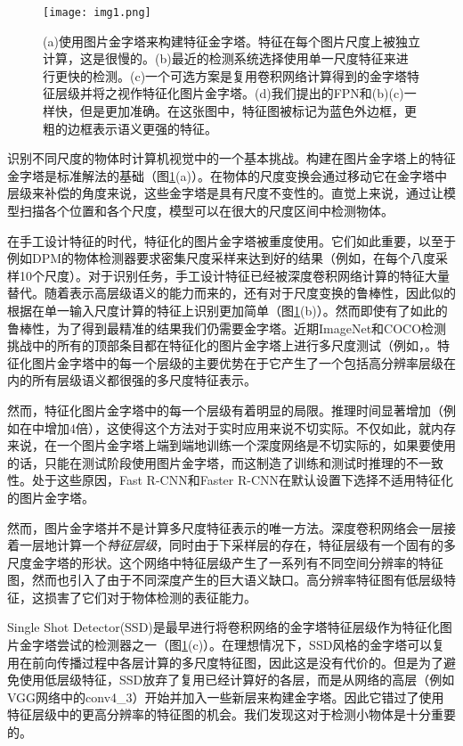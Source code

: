 \documentclass[../main.tex]{subfile}
\begin{document}
\begin{figure}[htb]
    \centering
    \texttt{[image: img1.png]}
    \caption{(a)使用图片金字塔来构建特征金字塔。特征在每个图片尺度上被独立计算，这是很慢的。(b)最近的检测系统选择使用单一尺度特征来进行更快的检测。(c)一个可选方案是复用卷积网络计算得到的金字塔特征层级并将之视作特征化图片金字塔。(d)我们提出的FPN和(b)(c)一样快，但是更加准确。在这张图中，特征图被标记为蓝色外边框，更粗的边框表示语义更强的特征。}
    \label{fig:img1}
\end{figure}


识别不同尺度的物体时计算机视觉中的一个基本挑战。构建在图片金字塔上的特征金字塔是标准解法的基础\cite{pyramid}（图\ref{fig:img1}(a)）。在物体的尺度变换会通过移动它在金字塔中层级来补偿的角度来说，这些金字塔是具有尺度不变性的。直觉上来说，通过让模型扫描各个位置和各个尺度，模型可以在很大的尺度区间中检测物体。

在手工设计特征的时代，特征化的图片金字塔被重度使用。它们如此重要，以至于例如DPM的物体检测器要求密集尺度采样来达到好的结果（例如，在每个八度采样10个尺度）。对于识别任务，手工设计特征已经被深度卷积网络计算的特征大量替代。随着表示高层级语义的能力而来的，还有对于尺度变换的鲁棒性，因此似的根据在单一输入尺度计算的特征上识别更加简单（图\ref{fig:img1}(b)）。然而即使有了如此的鲁棒性，为了得到最精准的结果我们仍需要金字塔。近期ImageNet和COCO检测挑战中的所有的顶部条目都在特征化的图片金字塔上进行多尺度测试（例如，\cite{resnet, rcnnohem}。特征化图片金字塔中的每一个层级的主要优势在于它产生了一个包括高分辨率层级在内的所有层级语义都很强的多尺度特征表示。

然而，特征化图片金字塔中的每一个层级有着明显的局限。推理时间显著增加（例如在\cite{4}中增加4倍），这使得这个方法对于实时应用来说不切实际。不仅如此，就内存来说，在一个图片金字塔上端到端地训练一个深度网络是不切实际的，如果要使用的话，只能在测试阶段使用图片金字塔，而这制造了训练和测试时推理的不一致性。处于这些原因，Fast R-CNN和Faster R-CNN在默认设置下选择不适用特征化的图片金字塔。

然而，图片金字塔并不是计算多尺度特征表示的唯一方法。深度卷积网络会一层接着一层地计算一个\textit{特征层级}，同时由于下采样层的存在，特征层级有一个固有的多尺度金字塔的形状。这个网络中特征层级产生了一系列有不同空间分辨率的特征图，然而也引入了由于不同深度产生的巨大语义缺口。高分辨率特征图有低层级特征，这损害了它们对于物体检测的表征能力。

Single Shot Detector(SSD)是最早进行将卷积网络的金字塔特征层级作为特征化图片金字塔尝试的检测器之一（图\ref{fig:img1}(c)）。在理想情况下，SSD风格的金字塔可以复用在前向传播过程中各层计算的多尺度特征图，因此这是没有代价的。但是为了避免使用低层级特征，SSD放弃了复用已经计算好的各层，而是从网络的高层（例如VGG网络中的conv4\_3）开始并加入一些新层来构建金字塔。因此它错过了使用特征层级中的更高分辨率的特征图的机会。我们发现这对于检测小物体是十分重要的。
\end{document}

